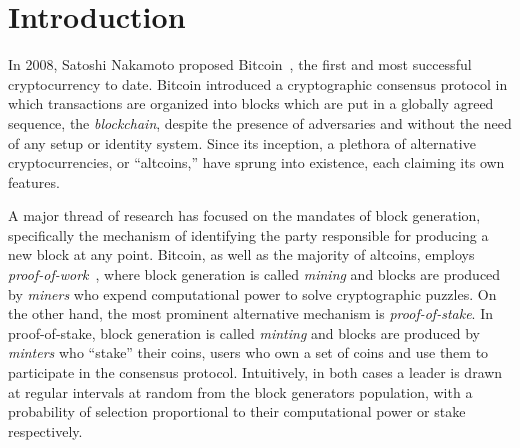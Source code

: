 
\section{Introduction}

In 2008, Satoshi Nakamoto proposed Bitcoin~\cite{bitcoin}, the first and most
successful cryptocurrency to date. Bitcoin introduced a cryptographic
consensus protocol in which transactions are organized into
blocks which are put in a globally agreed sequence, the
\emph{blockchain}, despite the presence of adversaries and without the need of
any setup or identity system. Since its inception, a plethora of alternative
cryptocurrencies, or ``altcoins,'' have sprung into existence, each claiming
its own features.

A major thread of research has focused on the mandates of block generation,
specifically the mechanism of identifying the party responsible for producing a
new block at any point. Bitcoin, as well as the majority of altcoins,
employs \emph{proof-of-work}~\cite{C:DwoNao92}, where block generation is
called \emph{mining} and blocks are produced by \emph{miners} who expend
computational power to solve cryptographic puzzles. On the other hand, the most
prominent alternative mechanism is \emph{proof-of-stake}. In proof-of-stake,
block generation is called \emph{minting} and blocks are produced by
\emph{minters} who ``stake'' their coins, \ie users who own a set of coins and
use them to participate in the consensus protocol. Intuitively, in both cases a
leader is drawn at regular intervals at random from the block generators
population, with a probability of selection proportional to their computational
power or stake respectively.

